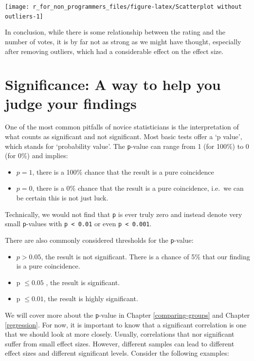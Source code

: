 \documentclass[
]{book}
\begin{document}
\begin{center}\texttt{[image: r\_for\_non\_programmers\_files/figure-latex/Scatterplot without outliers-1]} \end{center}

In conclusion, while there is some relationship between the rating and the number of votes, it is by far not as strong as we might have thought, especially after removing outliers, which had a considerable effect on the effect size.

\hypertarget{significance}{%
\section{Significance: A way to help you judge your findings}\label{significance}}

One of the most common pitfalls of novice statisticians is the interpretation of what counts as significant and not significant. Most basic tests offer a `p value', which stands for `probability value'. The \texttt{p}-value can range from 1 (for 100\%) to 0 (for 0\%) and implies:

\begin{itemize}
\item
  \(p = 1\), there is a 100\% chance that the result is a pure coincidence
\item
  \(p = 0\), there is a 0\% chance that the result is a pure coincidence, i.e.~we can be certain this is not just luck.
\end{itemize}

Technically, we would not find that \texttt{p} is ever truly zero and instead denote very small \texttt{p}-values with \texttt{p\ \textless{}\ 0.01} or even \texttt{p\ \textless{}\ 0.001}.

There are also commonly considered thresholds for the \texttt{p}-value:

\begin{itemize}
\item
  \(p > 0.05\), the result is not significant. There is a chance of 5\% that our finding is a pure coincidence.
\item
  p \(\leq 0.05\) , the result is significant.
\item
  p \(\leq 0.01\), the result is highly significant.
\end{itemize}

We will cover more about the \texttt{p}-value in Chapter \ref{comparing-groups} and Chapter \ref{regression}. For now, it is important to know that a significant correlation is one that we should look at more closely. Usually, correlations that nor significant suffer from small effect sizes. However, different samples can lead to different effect sizes and different significant levels. Consider the following examples:
\end{document}
